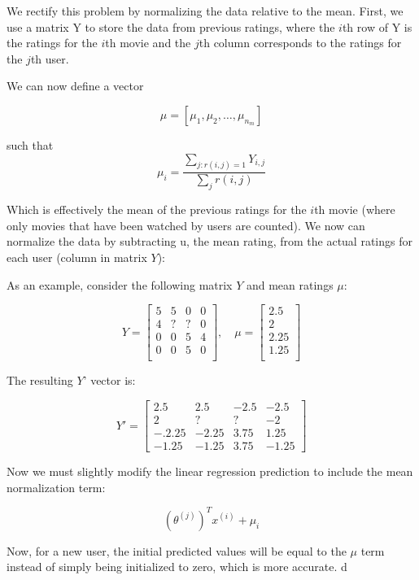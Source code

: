 We rectify this problem by normalizing the data relative to the mean. First, we use a matrix Y to store the data from previous ratings, where the $i$th row of Y is the ratings for the $i$th movie and the $j$th column corresponds to the ratings for the $j$th user.

We can now define a vector

$$\mu = [\mu_1, \mu_2, \dots , \mu_{n_m}]$$

such that
$$
\mu_i = \frac{\sum_{j:r(i,j)=1}{Y_{i,j}}}{\sum_{j}{r(i,j)}}$$

Which is effectively the mean of the previous ratings for the $i$th movie (where only movies that have been watched by users are counted). We now can normalize the data by subtracting u, the mean rating, from the actual ratings for each user (column in matrix $Y$):

As an example, consider the following matrix $Y$ and mean ratings $\mu$:

\begin{equation}
Y = 
\begin{bmatrix}
    5 & 5 & 0 & 0  \\
    4 & ? & ? & 0  \\
    0 & 0 & 5 & 4 \\
    0 & 0 & 5 & 0 \\
\end{bmatrix}, \quad
 \mu = 
\begin{bmatrix}
    2.5 \\
    2  \\
    2.25 \\
    1.25 \\
\end{bmatrix}
\end{equation}

The resulting $Y$' vector is:

\begin{equation}
Y' =
\begin{bmatrix}
  2.5    & 2.5   & -2.5 & -2.5 \\
  2      & ?     & ?    & -2 \\
  -.2.25 & -2.25 & 3.75 & 1.25 \\
  -1.25  & -1.25 & 3.75 & -1.25
\end{bmatrix}
\end{equation}

Now we must slightly modify the linear regression prediction to include the mean normalization term:

$$(\theta^{(j)})^T x^{(i)} + \mu_i$$

Now, for a new user, the initial predicted values will be equal to the $\mu$ term instead of simply being initialized to zero, which is more accurate.
d